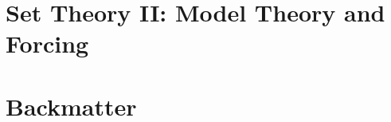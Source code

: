 \documentclass[11pt,numbers=noenddot]{scrreprt}
\begin{document}
\part{Set Theory II: Model Theory and Forcing}




\part{Backmatter}
\appendix




\clearpage
\printbibliography



%
%
\end{document}
